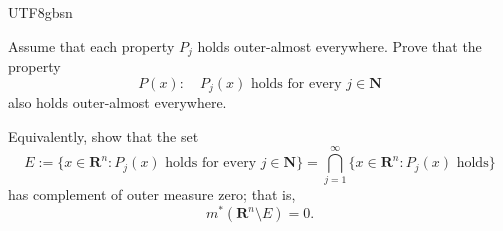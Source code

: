 \documentclass[addpoints]{exam}
\theoremstyle{definition}
\begin{document}
\begin{CJK*}{UTF8}{gbsn}
\begin{questions}
Assume that each property $P_j$ holds outer-almost everywhere. Prove that the property
\[
P(x): \quad P_j(x)\text{ holds for every } j\in \mathbf{N}
\]
also holds outer-almost everywhere.

Equivalently, show that the set
\[
E:=\{x\in \mathbf{R}^n : P_j(x)\text{ holds for every }j\in \mathbf{N}\}
=\bigcap_{j=1}^\infty \{x\in \mathbf{R}^n : P_j(x)\text{ holds}\}
\]
has complement of outer measure zero; that is,
\[
m^*(\mathbf{R}^n\setminus E)=0.
\]


\begin{solution} 

\end{solution}

\end{questions}
\end{CJK*}
\end{document}
